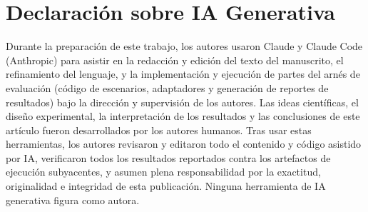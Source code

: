 \documentclass[conference,letterpaper]{IEEEtran}
\begin{document}
\section*{Declaraci\'on sobre IA Generativa}
Durante la preparaci\'on de este trabajo, los autores usaron Claude y Claude Code (Anthropic) para
asistir en la redacci\'on y edici\'on del texto del manuscrito, el refinamiento del lenguaje, y la
implementaci\'on y ejecuci\'on de partes del arn\'es de evaluaci\'on (c\'odigo de escenarios,
adaptadores y generaci\'on de reportes de resultados) bajo la direcci\'on y supervisi\'on de los
autores. Las ideas cient\'ificas, el dise\~no experimental, la interpretaci\'on de los resultados y
las conclusiones de este art\'iculo fueron desarrollados por los autores humanos. Tras usar estas
herramientas, los autores revisaron y editaron todo el contenido y c\'odigo asistido por IA,
verificaron todos los resultados reportados contra los artefactos de ejecuci\'on subyacentes, y
asumen plena responsabilidad por la exactitud, originalidad e integridad de esta publicaci\'on.
Ninguna herramienta de IA generativa figura como autora.

\balance


\end{document}
